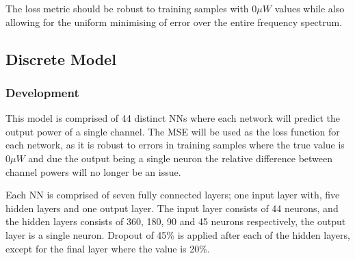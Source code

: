 The loss metric should be robust to training samples with $0\mu W$ values while also allowing for the uniform minimising of error over the entire frequency spectrum. 



\FloatBarrier
\subsection{Discrete Model}

\subsubsection{Development}

This model is comprised of 44 distinct NNs where each network will predict the output power of a single channel. The MSE will be used as the loss function for each network, as it is robust to errors in training samples where the true value is $0\mu W$ and due the output being a single neuron the relative difference between channel powers will no longer be an issue.

Each NN is comprised of seven fully connected layers; one input layer with, five hidden layers and one output layer. The input layer consists of 44 neurons, and the hidden layers consists of 360, 180, 90 and 45 neurons respectively, the output layer is a single neuron. Dropout of 45\% is applied after each of the hidden layers, except for the final layer where the value is 20\%.


